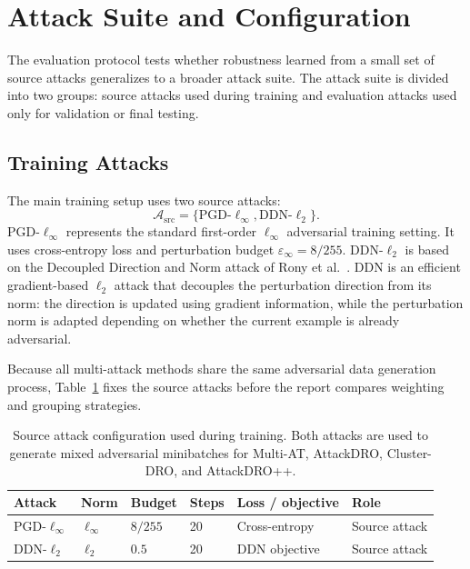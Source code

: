 \section{Attack Suite and Configuration}
The evaluation protocol tests whether robustness learned from a small set of source attacks generalizes to a broader attack suite. The attack suite is divided into two groups: source attacks used during training and evaluation attacks used only for validation or final testing.

\subsection{Training Attacks}
The main training setup uses two source attacks:
\[
    \mathcal{A}_{\mathrm{src}}
    =
    \{\text{PGD-}\ell_\infty,\text{DDN-}\ell_2\}.
\]
PGD-\(\ell_\infty\) represents the standard first-order \(\ell_\infty\) adversarial
training setting. It uses cross-entropy loss and perturbation budget
\(\varepsilon_\infty = 8/255\). DDN-\(\ell_2\) is based on the Decoupled Direction and
Norm attack of Rony et al.~\cite{rony2019decoupling}. DDN is an efficient gradient-based
\(\ell_2\) attack that decouples the perturbation direction from its norm: the direction
is updated using gradient information, while the perturbation norm is adapted depending
on whether the current example is already adversarial.



Because all multi-attack methods share the same adversarial data generation process,
Table~\ref{tab:ch5_training_attacks} fixes the source attacks before the report
compares weighting and grouping strategies.

\begin{table}[H]
\centering
\caption[Source attack configuration]{Source attack configuration used during training. Both attacks are used to generate mixed adversarial minibatches for Multi-AT, AttackDRO, Cluster-DRO, and AttackDRO++.}
\label{tab:ch5_training_attacks}
\begin{tabular}{llllll}
\toprule
Attack & Norm & Budget & Steps & Loss / objective & Role \\
\midrule
PGD-$\ell_\infty$ & $\ell_\infty$ & $8/255$ & 20 & Cross-entropy & Source attack \\
DDN-$\ell_2$ & $\ell_2$ & $0.5$ & 20 & DDN objective & Source attack \\
\bottomrule
\end{tabular}
\end{table}

